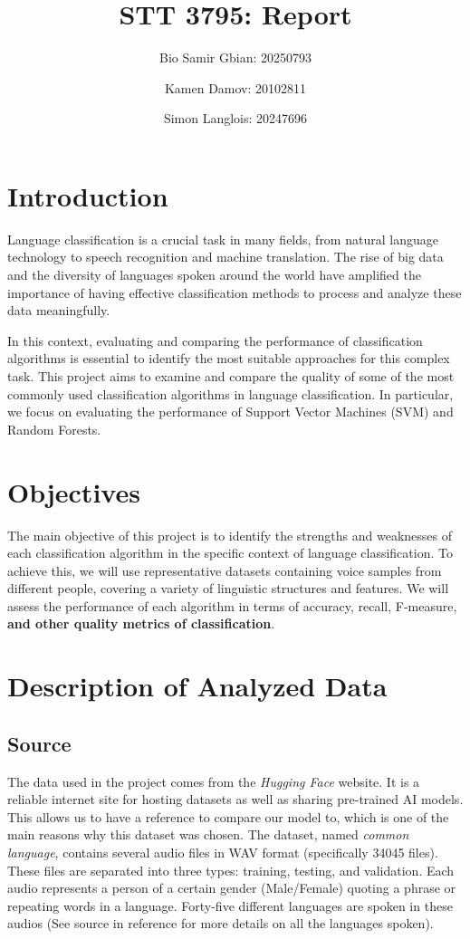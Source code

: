 \documentclass[twocolumn]{article}
\title{STT 3795: Report}
\author{Bio Samir Gbian: 20250793}
\author{Kamen Damov: 20102811}
\author{Simon Langlois: 20247696}
\affil{Department of Mathematics and Statistics}
\affil{University of Montreal}
\begin{document}
\maketitle

\section{Introduction}
Language classification is a crucial task in many fields, from natural language technology to speech recognition and machine translation. The rise of big data and the diversity of languages spoken around the world have amplified the importance of having effective classification methods to process and analyze these data meaningfully.

In this context, evaluating and comparing the performance of classification algorithms is essential to identify the most suitable approaches for this complex task. This project aims to examine and compare the quality of some of the most commonly used classification algorithms in language classification. In particular, we focus on evaluating the performance of Support Vector Machines (SVM) and Random Forests.

\section{Objectives}
The main objective of this project is to identify the strengths and weaknesses of each classification algorithm in the specific context of language classification. To achieve this, we will use representative datasets containing voice samples from different people, covering a variety of linguistic structures and features. We will assess the performance of each algorithm in terms of accuracy, recall, F-measure, \textbf{and other quality metrics of classification}.

\section{Description of Analyzed Data}
\subsection{Source}
The data used in the project comes from the \textit{Hugging Face} website. It is a reliable internet site for hosting datasets as well as sharing pre-trained AI models. This allows us to have a reference to compare our model to, which is one of the main reasons why this dataset was chosen.
The dataset, named \textit{common language}, contains several audio files in WAV format (specifically 34045 files). These files are separated into three types: training, testing, and validation. Each audio represents a person of a certain gender (Male/Female) quoting a phrase or repeating words in a language. Forty-five different languages are spoken in these audios (See source in reference for more details on all the languages spoken).
\end{document}
